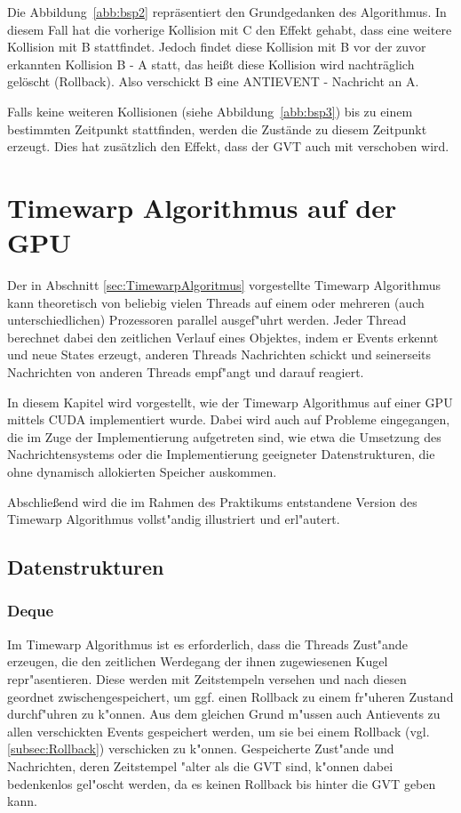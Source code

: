 \documentclass[a4paper, 10pt, openright, parskip, chapterprefix]{scrreprt}
\begin{document}
Die Abbildung~\ref{abb:bsp2} repräsentiert den Grundgedanken des Algorithmus. In diesem Fall hat die vorherige Kollision
mit C den Effekt gehabt, dass eine weitere Kollision mit B stattfindet. Jedoch findet diese Kollision mit B vor der zuvor erkannten Kollision B - A statt, das heißt diese Kollision wird nachträglich gelöscht (Rollback). Also verschickt B eine ANTIEVENT - Nachricht an A. 


Falls keine weiteren Kollisionen (siehe Abbildung~\ref{abb:bsp3}) bis zu einem bestimmten Zeitpunkt stattfinden, werden die Zustände zu diesem Zeitpunkt erzeugt. Dies hat zusätzlich den Effekt, dass der GVT auch mit verschoben wird.

\chapter[Timewarp Algorithmus auf der GPU - S. Brockmeyer]{Timewarp Algorithmus auf der GPU}
Der in Abschnitt \ref{sec:TimewarpAlgoritmus} vorgestellte Timewarp Algorithmus kann theoretisch von beliebig vielen
Threads auf einem oder mehreren (auch unterschiedlichen) Prozessoren
parallel ausgef"uhrt werden. Jeder Thread berechnet dabei den zeitlichen Verlauf eines Objektes, indem er Events erkennt
und neue States erzeugt, anderen Threads Nachrichten schickt und seinerseits Nachrichten von anderen Threads empf"angt
und darauf reagiert. 

In diesem Kapitel wird vorgestellt, wie der Timewarp Algorithmus auf einer GPU mittels CUDA implementiert wurde. Dabei wird
auch auf Probleme eingegangen, die im Zuge der Implementierung aufgetreten sind, wie etwa die Umsetzung des
Nachrichtensystems oder die Implementierung geeigneter Datenstrukturen, die ohne dynamisch allokierten Speicher
auskommen.

Abschlie\ss end wird die im Rahmen des Praktikums entstandene Version des Timewarp Algorithmus vollst"andig illustriert
und erl"autert.

\section{Datenstrukturen}
\subsection{Deque}
Im Timewarp Algorithmus ist es erforderlich, dass die Threads Zust"ande erzeugen, die den zeitlichen Werdegang der ihnen zugewiesenen
Kugel repr"asentieren. Diese werden mit Zeitstempeln versehen und nach diesen geordnet zwischengespeichert, um ggf. einen Rollback zu einem
fr"uheren Zustand durchf"uhren zu k"onnen. Aus dem gleichen Grund m"ussen auch Antievents zu allen verschickten Events gespeichert
werden, um sie bei einem Rollback (vgl. \ref{subsec:Rollback}) verschicken zu k"onnen.
Gespeicherte Zust"ande und Nachrichten, deren Zeitstempel "alter als die GVT sind, k"onnen dabei bedenkenlos gel"oscht
werden, da es keinen Rollback bis hinter die GVT geben kann.
\end{document}
